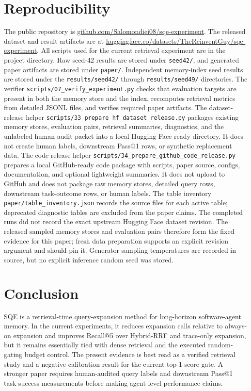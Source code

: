 \documentclass[10pt]{article}
\begin{document}
\section{Reproducibility}
The public repository is
\href{https://github.com/Salomondiei08/sqe-experiment}{github.com/Salomondiei08/sqe-experiment}.
The released dataset and result artifacts are at
\href{https://huggingface.co/datasets/TheReinventGuy/sqe-experiment}{huggingface.co/datasets/TheReinventGuy/sqe-experiment}.
All scripts used for the current retrieval experiment are in the project
directory. Raw seed-42 results are stored under \nolinkurl{seed42/},
and generated paper artifacts are stored under \texttt{paper/}. Independent
memory-index seed results are stored under the
\nolinkurl{results/seed42/} through
\nolinkurl{results/seed49/} directories.
The verifier \nolinkurl{scripts/07_verify_experiment.py} checks that evaluation
targets are present in both the memory store and the index, recomputes retrieval
metrics from detailed JSONL files, and verifies required paper artifacts.
The dataset-release helper \nolinkurl{scripts/33_prepare_hf_dataset_release.py}
packages existing memory stores, evaluation pairs, retrieval summaries,
diagnostics, and the unlabeled human-audit packet into a local Hugging
Face-ready directory. It does not create human labels, downstream Pass@1 rows,
or synthetic replacement data.
The code-release helper \nolinkurl{scripts/34_prepare_github_code_release.py}
prepares a local GitHub-ready code package with scripts, paper source, configs,
documentation, and optional lightweight summaries. It does not upload to
GitHub and does not package raw memory stores, detailed query rows, downstream
task-outcome rows, or human labels.
The table inventory \nolinkurl{paper/table_inventory.json} records the source
files for each active table; deprecated diagnostic tables are excluded from the
paper claims.
The completed runs did not record the exact upstream Hugging Face dataset
revision. The released sampled memory stores and evaluation pairs therefore form
the fixed evidence for this paper; fresh data preparation supports an explicit
revision argument and should pin it. Generator sampling temperatures are recorded
in source, but no explicit inference random seed was stored.

\section{Conclusion}
SQE is a retrieval-time query-expansion method for long-horizon software-agent
memory. In the current experiments, it reduces expansion calls relative to
always-on expansion and improves Recall@5 over Hybrid-RRF and trace-only
expansion, but it remains essentially tied with dense retrieval and the executed
random-gating budget control. The present evidence is best read as a
verified retrieval study and a negative calibration result for the
current top-1-score gate. A stronger paper requires human-audited query labels
and downstream Pass@1 task-success measurements before making agent-level
performance claims.
\end{document}

